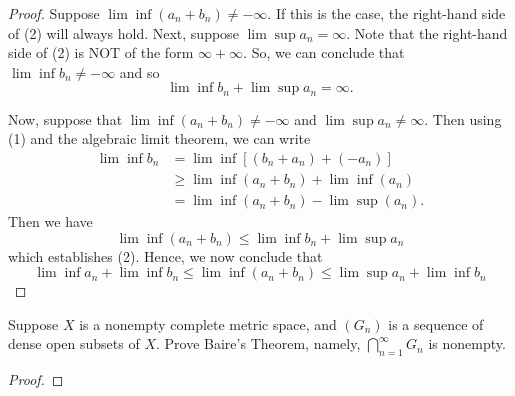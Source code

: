 \documentclass[a4paper]{article}
\begin{document}
\begin{proof}
Suppose \( \lim \inf ({a}_{n} + {b}_{n}) \neq - \infty   \). If this is the case, the right-hand side of (2) will always hold. Next, suppose \( \lim \sup {a}_{n} = \infty \). Note that the right-hand side of (2) is NOT of the form \( \infty  + \infty   \). So, we can conclude that \( \lim \inf {b}_{n} \neq - \infty  \) and so 
\[ \lim \inf {b}_{n} + \lim \sup {a}_{n} = \infty. \]

Now, suppose that \( \lim \inf ({a}_{n} + {b}_{n}) \neq - \infty   \) and \( \lim \sup {a}_{n} \neq \infty \). Then using (1) and the algebraic limit theorem, we can write
\begin{align*}
    \lim \inf {b}_{n} &= \lim \inf [({b}_{n} + {a}_{n}) + (- {a}_{n})] \\
                      &\geq \lim \inf ({a}_{n} + {b}_{n}) + \lim \inf ({a}_{n}) \tag{ALT and (1)} \\
                      &= \lim \inf ({a}_{n} + {b}_{n}) - \lim \sup ({a}_{n})   \tag{Exercise 9}.
\end{align*}
Then we have 
\[  \lim \inf ({a}_{n} + {b}_{n}) \leq \lim \inf {b}_{n} + \lim \sup {a}_{n} \]
which establishes (2). Hence, we now conclude that 
   \[  \lim \inf {a}_{n} + \lim \inf {b}_{n} \leq \lim \inf({a}_{n} + {b}_{n}) \leq \lim \sup {a}_{n} + \lim \inf {b}_{n}  \]
\end{proof}

\begin{problem}
    Suppose \( X  \) is a nonempty complete metric space, and \( ({G}_{n}) \) is a sequence of dense open subsets of \( X  \). Prove Baire's Theorem, namely, \( \bigcap_{ n=1  }^{ \infty  }  {G}_{n}  \) is nonempty.
\end{problem}
\begin{proof}

\end{proof}
\end{document}
